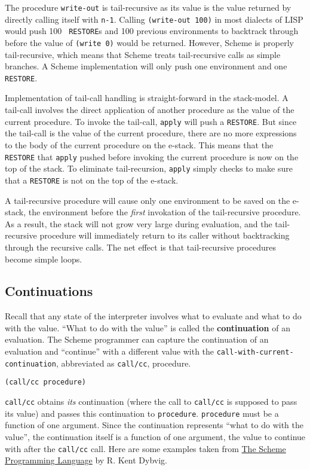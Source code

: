 	The procedure {\tt write-out} is tail-recursive as its value is
the value returned by directly calling itself with {\tt n-1}.  Calling
{\tt (write-out 100)} in most dialects of LISP would push 100 {\tt
RESTORE}s and 100 previous environments to backtrack through before the
value of {\tt (write 0)} would be returned.  However, Scheme is properly
tail-recursive, which means that Scheme treats tail-recursive calls as
simple branches.  A Scheme implementation will only push one environment
and one {\tt RESTORE}.

	Implementation of tail-call handling is straight-forward in the
stack-model.  A tail-call involves the direct application of another
procedure as the value of the current procedure.  To invoke the tail-call,
{\tt apply} will push a {\tt RESTORE}.  But since the tail-call is the
value of the current procedure, there are no more expressions to the body
of the current procedure on the e-stack.  This means that the {\tt
RESTORE} that {\tt apply} pushed before invoking the current procedure is
now on the top of the stack.  To eliminate tail-recursion, {\tt apply}
simply checks to make sure that a {\tt RESTORE} is not on the top of the
e-stack.

	A tail-recursive procedure will cause only one environment to be
saved on the e-stack, the environment before the {\em first} invokation of
the tail-recursive procedure.  As a result, the stack will not grow very
large during evaluation, and the tail-recursive procedure will immediately
return to its caller without backtracking through the recursive calls.
The net effect is that tail-recursive procedures become simple loops.

   \subsection{Continuations}

	Recall that any state of the interpreter involves what to evaluate
and what to do with the value.  ``What to do with the value'' is called
the {\bf continuation} of an evaluation.  The Scheme programmer can
capture the continuation of an evaluation and ``continue'' with a
different value with the {\tt call-with-current-continuation}, abbreviated
as {\tt call/cc}, procedure.

\begin{center}
{\tt (call/cc procedure)}
\end{center}

	{\tt call/cc} obtains {\em its} continuation (where the call to
{\tt call/cc} is supposed to pass its value) and passes this continuation
to {\tt procedure}.  {\tt procedure} must be a function of one argument.
Since the continuation represents ``what to do with the value'', the
continuation itself is a function of one argument, the value to continue
with after the {\tt call/cc} call.  Here are some examples taken from
\underline{The Scheme Programming Language} by R. Kent Dybvig.

